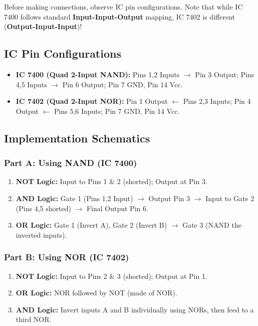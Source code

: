 \begin{commonmistake}
Before making connections, observe IC pin configurations. Note that while IC 7400 follows standard \textbf{Input-Input-Output} mapping, IC 7402 is different (\textbf{Output-Input-Input})!
\end{commonmistake}

\subsection{IC Pin Configurations}
\begin{itemize}
    \item \textbf{IC 7400 (Quad 2-Input NAND):} Pins 1,2 Inputs $\to$ Pin 3 Output; Pins 4,5 Inputs $\to$ Pin 6 Output; Pin 7 GND, Pin 14 Vcc.
    \item \textbf{IC 7402 (Quad 2-Input NOR):} Pin 1 Output $\leftarrow$ Pins 2,3 Inputs; Pin 4 Output $\leftarrow$ Pins 5,6 Inputs; Pin 7 GND, Pin 14 Vcc.
\end{itemize}

\subsection{Implementation Schematics}

\subsubsection{Part A: Using NAND (IC 7400)}
\begin{enumerate}
    \item \textbf{NOT Logic:} Input to Pins 1 \& 2 (shorted); Output at Pin 3.
    \item \textbf{AND Logic:} Gate 1 (Pins 1,2 Input) $\to$ Output Pin 3 $\to$ Input to Gate 2 (Pins 4,5 shorted) $\to$ Final Output Pin 6.
    \item \textbf{OR Logic:} Gate 1 (Invert A), Gate 2 (Invert B) $\to$ Gate 3 (NAND the inverted inputs).
\end{enumerate}

\subsubsection{Part B: Using NOR (IC 7402)}
\begin{enumerate}
    \item \textbf{NOT Logic:} Input to Pins 2 \& 3 (shorted); Output at Pin 1.
    \item \textbf{OR Logic:} NOR followed by NOT (made of NOR).
    \item \textbf{AND Logic:} Invert inputs A and B individually using NORs, then feed to a third NOR.
\end{enumerate}

